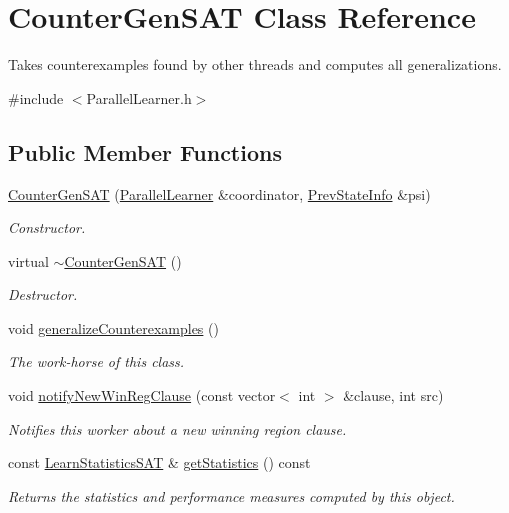 \hypertarget{classCounterGenSAT}{\section{Counter\-Gen\-S\-A\-T Class Reference}
\label{classCounterGenSAT}
}


Takes counterexamples found by other threads and computes all generalizations.  




{\ttfamily \#include $<$Parallel\-Learner.\-h$>$}

\subsection*{Public Member Functions}
\begin{DoxyCompactItemize}
\item 
\hyperlink{classCounterGenSAT_a9ec36aa9bd2df6f00495524868c565d9}{Counter\-Gen\-S\-A\-T} (\hyperlink{classParallelLearner}{Parallel\-Learner} \&coordinator, \hyperlink{classPrevStateInfo}{Prev\-State\-Info} \&psi)
\begin{DoxyCompactList}\small\item\em Constructor. \end{DoxyCompactList}\item 
virtual \hyperlink{classCounterGenSAT_abcdbdc95c437f8a66c7fe3e803cc4722}{$\sim$\-Counter\-Gen\-S\-A\-T} ()
\begin{DoxyCompactList}\small\item\em Destructor. \end{DoxyCompactList}\item 
void \hyperlink{classCounterGenSAT_af8e756f76eaa958f461a760926a46875}{generalize\-Counterexamples} ()
\begin{DoxyCompactList}\small\item\em The work-\/horse of this class. \end{DoxyCompactList}\item 
void \hyperlink{classCounterGenSAT_a4938f8d5e2322e791bb26d8a5f6ebf04}{notify\-New\-Win\-Reg\-Clause} (const vector$<$ int $>$ \&clause, int src)
\begin{DoxyCompactList}\small\item\em Notifies this worker about a new winning region clause. \end{DoxyCompactList}\item 
const \hyperlink{classLearnStatisticsSAT}{Learn\-Statistics\-S\-A\-T} \& \hyperlink{classCounterGenSAT_aaa097494ceaf4670b20d90f6fa0f607d}{get\-Statistics} () const 
\begin{DoxyCompactList}\small\item\em Returns the statistics and performance measures computed by this object. \end{DoxyCompactList}\end{DoxyCompactItemize}
